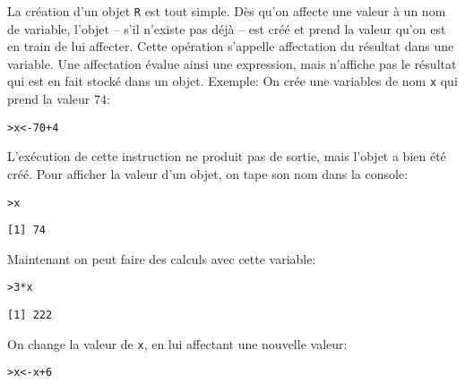 \documentclass[11pt]{article}
\makeatletter
\numberwithin{equation}{section}
\theoremstyle{remark}
\newenvironment{kframe}{%
 \def\at@end@of@kframe{}%
 \ifinner\ifhmode%
  \def\at@end@of@kframe{\end{minipage}}%
  \begin{minipage}{\columnwidth}%
 \fi\fi%
 \def\FrameCommand##1{\hskip\@totalleftmargin \hskip-\fboxsep
 \colorbox{shadecolor}{##1}\hskip-\fboxsep
     \hskip-\linewidth \hskip-\@totalleftmargin \hskip\columnwidth}%
 \MakeFramed {\advance\hsize-\width
   \@totalleftmargin\z@ \linewidth\hsize
   \@setminipage}}%
 {\par\unskip\endMakeFramed%
 \at@end@of@kframe}
\newenvironment{knitrout}{}{}
\newcommand{\hlnum}[1]{\textcolor[rgb]{0.43,0.21,0.1}{#1}}%
\newcommand{\hlopt}[1]{\textcolor[rgb]{0,0,0}{#1}}%
\newcommand{\hlstd}[1]{\textcolor[rgb]{0,0.2,0.4}{#1}}%
\newcommand{\hlkwb}[1]{\textcolor[rgb]{0.69,0.353,0.396}{#1}}%
\makeatother
\begin{document}
La création d'un objet \texttt{R} est tout simple. Dès qu'on affecte une valeur à un nom de variable, l'objet -- s'il n'existe pas déjà -- est créé et prend la valeur qu'on est en train de lui affecter. Cette opération s'appelle
 affectation du résultat dans une variable. 
Une affectation évalue
ainsi une expression, mais n'affiche pas le résultat qui est en fait stocké dans
un objet. 
Exemple: On crée une variables de nom \texttt{x} qui prend la valeur $74$:
\begin{knitrout}
\color{fgcolor}\begin{kframe}
\begin{alltt}
\hlstd{> }\hlstd{x} \hlkwb{<-} \hlnum{70} \hlopt{+} \hlnum{4}
\end{alltt}
\end{kframe}
\end{knitrout}
L'exécution de cette instruction ne produit pas de sortie, mais l'objet a bien été créé. Pour afficher la valeur d'un objet, on tape son nom dans la console:
\begin{knitrout}
\color{fgcolor}\begin{kframe}
\begin{alltt}
\hlstd{> }\hlstd{x}
\end{alltt}
\begin{verbatim}
[1] 74
\end{verbatim}
\end{kframe}
\end{knitrout}
Maintenant on peut faire des calculs avec cette variable:
\begin{knitrout}
\color{fgcolor}\begin{kframe}
\begin{alltt}
\hlstd{> }\hlnum{3}\hlopt{*}\hlstd{x}
\end{alltt}
\begin{verbatim}
[1] 222
\end{verbatim}
\end{kframe}
\end{knitrout}
On change la valeur de \texttt{x}, en lui affectant une nouvelle valeur:
\begin{knitrout}
\color{fgcolor}\begin{kframe}
\begin{alltt}
\hlstd{> }\hlstd{x} \hlkwb{<-} \hlstd{x}\hlopt{+}\hlnum{6}
\end{alltt}
\end{kframe}
\end{knitrout}
\end{document}
